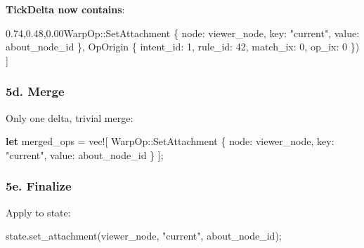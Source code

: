 \documentclass[
  11pt,
]{book}
\newenvironment{Shaded}{}{}
\newcommand{\DecValTok}[1]{\textcolor[rgb]{0.25,0.63,0.44}{#1}}
\newcommand{\KeywordTok}[1]{\textcolor[rgb]{0.00,0.44,0.13}{\textbf{#1}}}
\newcommand{\NormalTok}[1]{#1}
\newcommand{\OperatorTok}[1]{\textcolor[rgb]{0.40,0.40,0.40}{#1}}
\newcommand{\PreprocessorTok}[1]{\textcolor[rgb]{0.74,0.48,0.00}{#1}}
\newcommand{\StringTok}[1]{\textcolor[rgb]{0.25,0.44,0.63}{#1}}
\begin{document}
\textbf{TickDelta now contains}:

\begin{Shaded}
\begin{Highlighting}[]
\NormalTok{[}
\NormalTok{    (}\PreprocessorTok{WarpOp::}\NormalTok{SetAttachment }\OperatorTok{\{}
\NormalTok{        node}\OperatorTok{:}\NormalTok{ viewer\_node}\OperatorTok{,}
\NormalTok{        key}\OperatorTok{:} \StringTok{"current"}\OperatorTok{,}
\NormalTok{        value}\OperatorTok{:}\NormalTok{ about\_node\_id}
    \OperatorTok{\},}\NormalTok{ OpOrigin }\OperatorTok{\{}\NormalTok{ intent\_id}\OperatorTok{:} \DecValTok{1}\OperatorTok{,}\NormalTok{ rule\_id}\OperatorTok{:} \DecValTok{42}\OperatorTok{,}\NormalTok{ match\_ix}\OperatorTok{:} \DecValTok{0}\OperatorTok{,}\NormalTok{ op\_ix}\OperatorTok{:} \DecValTok{0} \OperatorTok{\}}\NormalTok{)}
\NormalTok{]}
\end{Highlighting}
\end{Shaded}

\subsubsection{5d. Merge}\label{d.-merge}

Only one delta, trivial merge:

\begin{Shaded}
\begin{Highlighting}[]
\KeywordTok{let}\NormalTok{ merged\_ops }\OperatorTok{=} \PreprocessorTok{vec!}\NormalTok{[}
    \PreprocessorTok{WarpOp::}\NormalTok{SetAttachment }\OperatorTok{\{}\NormalTok{ node}\OperatorTok{:}\NormalTok{ viewer\_node}\OperatorTok{,}\NormalTok{ key}\OperatorTok{:} \StringTok{"current"}\OperatorTok{,}\NormalTok{ value}\OperatorTok{:}\NormalTok{ about\_node\_id }\OperatorTok{\}}
\NormalTok{]}\OperatorTok{;}
\end{Highlighting}
\end{Shaded}

\subsubsection{5e. Finalize}\label{e.-finalize}

Apply to state:

\begin{Shaded}
\begin{Highlighting}[]
\NormalTok{state}\OperatorTok{.}\NormalTok{set\_attachment(viewer\_node}\OperatorTok{,} \StringTok{"current"}\OperatorTok{,}\NormalTok{ about\_node\_id)}\OperatorTok{;}
\end{Highlighting}
\end{Shaded}
\end{document}

